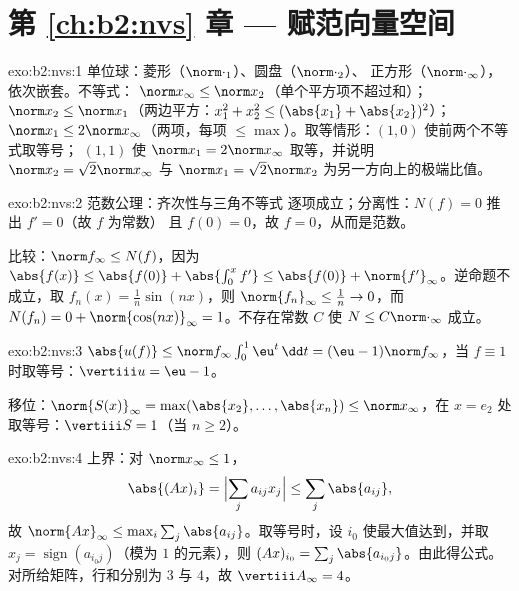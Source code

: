 \section*{第 \ref{ch:b2:nvs} 章 --- 赋范向量空间}

\begin{solution}{exo:b2:nvs:1}
单位球：菱形（$\norm\cdot_1$）、圆盘（$\norm\cdot_2$）、
正方形（$\norm\cdot_\infty$），依次嵌套。不等式：
$\norm x_\infty \leq \norm x_2$（单个平方项不超过和）；
$\norm x_2 \leq \norm x_1$（两边平方：$x_1^2 + x_2^2 \leq (\abs{x_1}
+ \abs{x_2})^2$）；$\norm x_1 \leq 2\norm x_\infty$（两项，每项
$\leq \max$）。取等情形：$(1, 0)$ 使前两个不等式取等号；
$(1, 1)$ 使 $\norm x_1 = 2\norm x_\infty$ 取等，并说明
$\norm x_2 = \sqrt2 \norm x_\infty$ 与 $\norm x_1 = \sqrt2 \norm
x_2$ 为另一方向上的极端比值。
\end{solution}

\begin{solution}{exo:b2:nvs:2}
范数公理：齐次性与三角不等式
逐项成立；分离性：$N(f) = 0$ 推出 $f' = 0$（故 $f$ 为常数）
且 $f(0) = 0$，故 $f = 0$，从而是范数。

比较：$\norm f_\infty \leq N(f)$，因为 $\abs{f(x)} \leq
\abs{f(0)} + \abs{\int_0^x f'} \leq \abs{f(0)} +
\norm{f'}_\infty$。逆命题不成立，取 $f_n(x) = \frac1n
\sin(nx)$，则 $\norm{f_n}_\infty \leq \frac1n \to 0$，而
$N(f_n) = 0 + \norm{\cos(nx)}_\infty = 1$。不存在常数 $C$ 使
$N \leq C\norm\cdot_\infty$ 成立。
\end{solution}

\begin{solution}{exo:b2:nvs:3}
$\abs{u(f)} \leq \norm f_\infty \int_0^1 \eu^t\,\dd t = (\eu -
1)\norm f_\infty$，当 $f \equiv 1$ 时取等号：$\vertiii u =
\eu - 1$。

移位：$\norm{S(x)}_\infty = \max(\abs{x_2}, \dots, \abs{x_n}) \leq
\norm x_\infty$，在 $x = e_2$ 处取等号：$\vertiii S = 1$（当 $n
\geq 2$）。
\end{solution}

\begin{solution}{exo:b2:nvs:4}
上界：对 $\norm x_\infty \leq 1$，
\[
\abs{(Ax)_i} = \Bigl|\sum_j a_{ij}x_j\Bigr| \leq \sum_j
\abs{a_{ij}},
\]
故 $\norm{Ax}_\infty \leq \max_i \sum_j \abs{a_{ij}}$。取等号时，设
$i_0$ 使最大值达到，并取 $x_j = \operatorname{sign}(a_{i_0
j})$（模为 $1$ 的元素），则 $(Ax)_{i_0} = \sum_j \abs{a_{i_0
j}}$。由此得公式。对所给矩阵，行和分别为 $3$ 与
$4$，故 $\vertiii A_\infty = 4$。
\end{solution}

